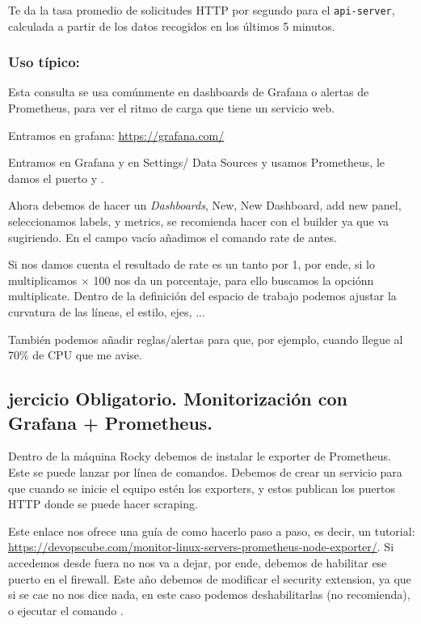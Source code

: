 Te da la tasa promedio de solicitudes HTTP por segundo para el \texttt{api-server}, calculada a partir de los datos recogidos en los últimos 5 minutos.

\subsubsection*{ Uso típico:}

Esta consulta se usa comúnmente en dashboards de Grafana o alertas de Prometheus, para ver el ritmo de carga que tiene un servicio web.

Entramos en grafana: \url{https://grafana.com/}

Entramos en Grafana y en Settings/ Data Sources y usamos Prometheus, le damos el puerto y .

Ahora debemos de hacer un \textit{Dashboards}, New, New Dashboard, add new panel, seleccionamos labels, y metrics, se recomienda hacer con el builder ya que va sugiriendo. En el campo vacío añadimos el comando rate de antes.

Si nos damos cuenta el resultado de rate es un tanto por 1, por ende, si lo multiplicamos $\times$ 100 nos da un porcentaje, para ello buscamos la opciónn multiplicate. Dentro de la definición del espacio de trabajo podemos ajustar la curvatura de las líneas, el estilo, ejes, ...

También podemos añadir reglas/alertas para que, por ejemplo, cuando llegue al 70\% de CPU que me avise.

\subsection{jercicio Obligatorio. Monitorización con Grafana + Prometheus.}

Dentro de la máquina Rocky debemos de instalar le exporter de Prometheus. Este se puede lanzar por línea de comandos. Debemos de crear un servicio para que cuando se inicie el equipo estén los exporters, y estos publican los puertos HTTP donde se puede hacer scraping.

Este enlace nos ofrece una guía de como hacerlo paso a paso, es decir, un tutorial: \url{https://devopscube.com/monitor-linux-servers-prometheus-node-exporter/}. Si accedemos desde fuera no nos va a dejar, por ende, debemos de habilitar ese puerto en el firewall. Este año debemos de modificar el security extension, ya que si se cae no nos dice nada, en este caso podemos deshabilitarlas (no recomienda), o ejecutar el comando .

